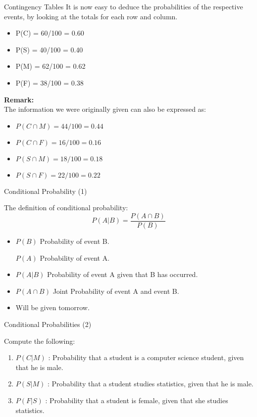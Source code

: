 {{{{{{{}
{
	{Contingency Tables}
	It is now easy to deduce the probabilities of the respective events, by looking at the totals for each row and column.
	\begin{itemize}
		\item P(C) = 60/100 = 0.60
		\item P(S) = 40/100 = 0.40
		\item P(M) = 62/100 = 0.62
		\item P(F) = 38/100 = 0.38
	\end{itemize}
	\textbf{Remark:}\\
	The information we were originally given can also be expressed as:
	\begin{itemize}
		\item $P(C \cap M) = 44/100 = 0.44$
		\item $P(C \cap F) = 16/100 = 0.16$
		\item $P(S \cap M) = 18/100 = 0.18$
		\item $P(S \cap F) = 22/100 = 0.22$
	\end{itemize}
}

{
	{Conditional Probability (1)}
	
	The definition of conditional probability:
	\[ P(A|B) = \frac{P(A \cap B)}{P(B)} \]
	
	\begin{itemize}
		\item $P(B)$ Probability of event B.
		\item [ $P(A)$ Probability of event A. ]
		\item $P(A|B)$ Probability of event A given that B has occurred.
		\item $P(A \cap B)$ Joint Probability of event A and event B.
		\item Will be given tomorrow.
	\end{itemize}
	
}


{
	{Conditional Probabilities (2)}
	
	Compute the following:
	\begin{enumerate}
		\item $P(C|M)$ : Probability that a student is a computer science student, given that he is male.
		\item $P(S|M)$ : Probability that a student studies statistics, given that he is male.
		\item $P(F|S)$ : Probability that a student is female, given that she studies statistics.
	\end{enumerate}
	
}}}}}}}
